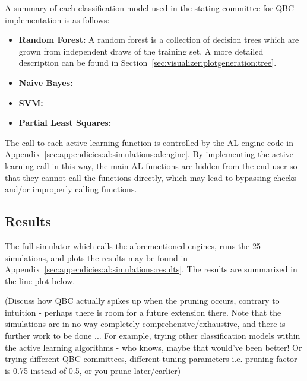 A summary of each classification model used in the stating committee for QBC 
implementation is as follows:

\tablespacing
\begin{itemize}
	\item \textbf{Random Forest:} A random forest is a collection of decision 
	trees which are grown from independent draws of the training set. A more 
	detailed description can be found in 
	Section~\ref{sec:visualizer:plotgeneration:tree}.
	\item \textbf{Naive Bayes:}
	\item \textbf{SVM:}
	\item \textbf{Partial Least Squares:}
\end{itemize}
\bodyspacing

The call to each active learning function is controlled by the AL engine code 
in Appendix~\ref{sec:appendicies:al:simulations:alengine}. By implementing the 
active learning call in this way, the main AL functions are hidden from the end 
user so that they cannot call the functions directly, which may lead to 
bypassing checks and/or improperly calling functions.



\subsection{Results}
\label{sec:al:simulation:results}

The full simulator which calls the aforementioned engines, runs the 25 
simulations, and plots the results may be found in 
Appendix~\ref{sec:appendicies:al:simulations:results}.
The results are summarized in the line plot below.

(Discuss how QBC actually spikes up when the pruning occurs, contrary to 
intuition - perhaps there is room for a future extension there. Note that the 
simulations are in no way completely comprehensive/exhaustive, and there is 
further work 
to be done ... For example, trying other classification models within the 
active learning algorithms - who knows, maybe that would've been better! Or 
trying different QBC committees, different tuning parameters i.e. pruning 
factor is 0.75 instead of 0.5, or you prune later/earlier)